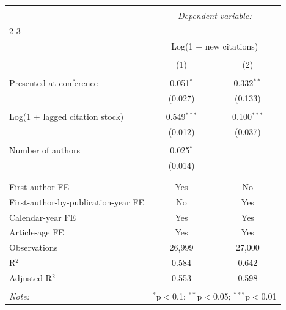 
\begin{tabular}{@{\extracolsep{5pt}}lcc} 
\\[-1.8ex]\hline 
\hline \\[-1.8ex] 
 & \multicolumn{2}{c}{\textit{Dependent variable:}} \\ 
\cline{2-3} 
\\[-1.8ex] & \multicolumn{2}{c}{Log(1 + new citations)} \\ 
\\[-1.8ex] & (1) & (2)\\ 
\hline \\[-1.8ex] 
 Presented at conference & 0.051$^{*}$ & 0.332$^{**}$ \\ 
  & (0.027) & (0.133) \\ 
  & & \\ 
 Log(1 + lagged citation stock) & 0.549$^{***}$ & 0.100$^{***}$ \\ 
  & (0.012) & (0.037) \\ 
  & & \\ 
 Number of authors & 0.025$^{*}$ &  \\ 
  & (0.014) &  \\ 
  & & \\ 
\hline \\[-1.8ex] 
First-author FE & Yes & No \\ 
First-author-by-publication-year FE & No & Yes \\ 
Calendar-year FE & Yes & Yes \\ 
Article-age FE & Yes & Yes \\ 
Observations & 26,999 & 27,000 \\ 
R$^{2}$ & 0.584 & 0.642 \\ 
Adjusted R$^{2}$ & 0.553 & 0.598 \\ 
\hline 
\hline \\[-1.8ex] 
\textit{Note:}  & \multicolumn{2}{r}{$^{*}$p$<$0.1; $^{**}$p$<$0.05; $^{***}$p$<$0.01} \\ 
\end{tabular} 

